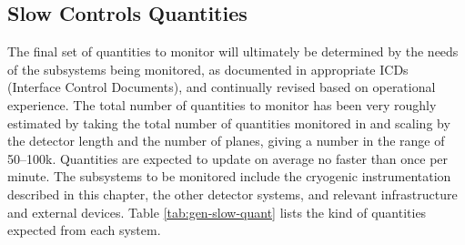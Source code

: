 \subsection{Slow Controls Quantities}
\label{sec:fdgen-slow-cryo-quant}


The final set of quantities to monitor will ultimately be determined
by the needs of the subsystems being monitored, as documented in
appropriate ICDs (Interface Control Documents), and continually revised based on operational
experience.  The total number of quantities to monitor has been very
roughly estimated by taking the total number of quantities monitored
in \microboone and scaling by the detector length and the number of
planes, giving a number in the range of \numrange{50}{100}k.
Quantities are expected to update on average no faster than once per minute.
The subsystems
to be monitored include the %
cryogenic instrumentation
described in this chapter, the other detector systems, and relevant
infrastructure and external devices. Table \ref{tab:gen-slow-quant}
lists the kind of quantities expected from each system.

